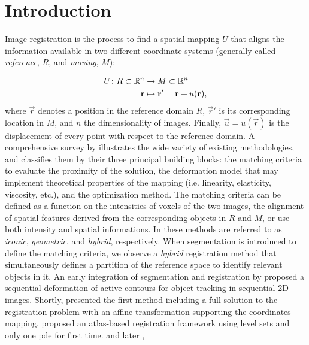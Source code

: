 \section{Introduction}\label{sec:introduction}
Image registration is the process to find a spatial mapping $U$ that aligns the information available
  in two different coordinate systems (generally called \emph{reference},
  $R$, and \emph{moving}, $M$):%

  \begin{align}
  U\colon R \subset \mathbb{R}^n &\to M \subset \mathbb{R}^n \notag\\
  \vec{r} &\mapsto \vec{r}' =\vec{r}+u(\vec{r}),
  \label{eq:transform}
  \end{align}
%
  where $\vec{r}$ denotes a position in the reference domain $R$, $\vec{r}'$ is
  its corresponding location in $M$, and $n$ the dimensionality of images.
Finally, $\vec{u} = u(\vec{r})$ is the displacement of every point with respect
  to the reference domain.
A comprehensive survey by \cite{sotiras_deformable_2013} illustrates the wide variety
  of existing methodologies, and classifies them by their three principal building blocks:
  the matching criteria to evaluate the proximity of the solution,
  the deformation model that may implement theoretical properties of the mapping
  (i.e. linearity, elasticity, viscosity, etc.), and the optimization method.
The matching criteria can be defined as a function on the intensities of voxels of the
  two images, the alignment of spatial features derived from the corresponding objects in
  $R$ and $M$, or use both intensity and spatial informations.
In \citep{sotiras_deformable_2013} these methods are referred to as \emph{iconic}, \emph{geometric},
  and \emph{hybrid}, respectively.
When segmentation is introduced to define the matching criteria, we observe a \emph{hybrid}
  registration method that simultaneously defines a partition of the reference space to identify
  relevant objects in it.
An early integration of segmentation and registration by \cite{bertalmio_morphing_2000} proposed
  a sequential deformation of active contours for object tracking in sequential 2D images.
Shortly, \cite{yezzi_variational_2001} presented the first method including a full solution to
  the registration problem with an affine transformation supporting the coordinates mapping.
\cite{vemuri_joint_2003} proposed an atlas-based registration framework using level sets and only
  one \gls*{pde} for first time.
\cite{unal_coupled_2005} and later \cite{wang_joint_2006},
